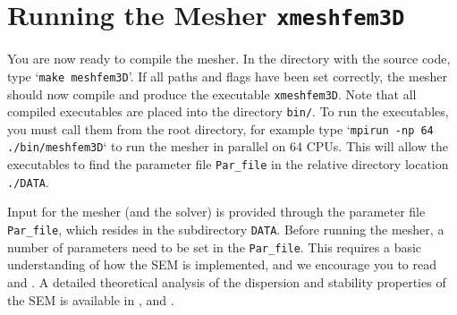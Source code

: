 
\chapter{Running the Mesher \texttt{xmeshfem3D}}\label{cha:Running-the-Mesher}


You are now ready to compile the mesher. In the directory with the
source code, type `\texttt{make meshfem3D}'. If all paths and flags
have been set correctly, the mesher should now compile and produce
the executable \texttt{xmeshfem3D}.
Note that all compiled executables are placed into the directory \texttt{bin/}.
To run the executables, you must call them from the root directory,
for example type `\texttt{mpirun -np 64 ./bin/meshfem3D}` to run the mesher
in parallel on 64 CPUs. This will allow the executables to find the parameter file
\texttt{Par\_file} in the relative directory location \texttt{./DATA}.\newline


Input for the mesher (and the solver) is provided through the parameter
file \texttt{Par\_file}, which resides in the subdirectory \texttt{DATA}.
Before running the mesher, a number of parameters need to be set in
the \texttt{Par\_file}. This requires a basic understanding of how
the SEM is implemented, and we encourage you to read \citet{KoVi98,KoTr99,Ch00,KoTr02a,KoTr02b,KoRiTr02,ChCaVi03,CaChViMo03}
and \citet{ChVa04}. A detailed theoretical analysis of the dispersion
and stability properties of the SEM is available in \citet{Coh02}, \citet{DeSe07}
and \citet{SeOl07}.\newline


